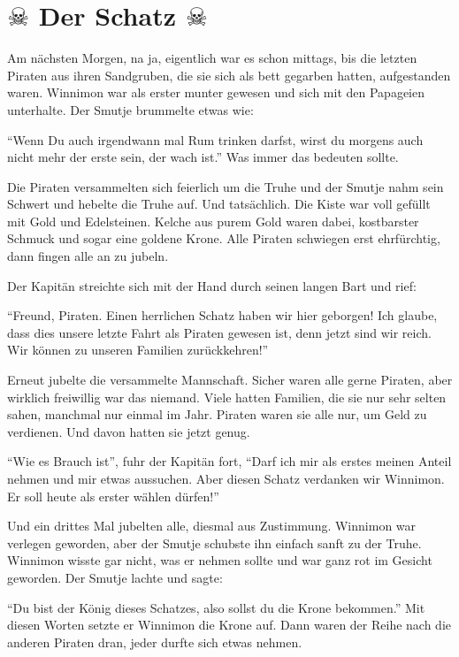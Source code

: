 \section*{\center $\skull$ Der Schatz $\skull$}
Am nächsten Morgen, na ja, eigentlich war es schon mittags, bis die letzten Piraten aus ihren Sandgruben, die sie sich als bett gegarben hatten, aufgestanden waren. Winnimon war als erster munter gewesen und sich mit den Papageien unterhalte. Der Smutje brummelte etwas wie: 

\enquote{Wenn Du auch irgendwann mal Rum trinken darfst, wirst du morgens auch nicht mehr der erste sein, der wach ist.} Was immer das bedeuten sollte.

Die Piraten versammelten sich feierlich um die Truhe und der Smutje nahm sein Schwert und hebelte die Truhe auf. Und tatsächlich. Die Kiste war voll gefüllt mit Gold und Edelsteinen. Kelche aus purem Gold waren dabei, kostbarster Schmuck und sogar eine goldene Krone. Alle Piraten schwiegen erst ehrfürchtig, dann fingen alle an zu jubeln.

Der Kapitän streichte sich mit der Hand durch seinen langen Bart und rief:

\enquote{Freund, Piraten. Einen herrlichen Schatz haben wir hier geborgen! Ich glaube, dass dies unsere letzte Fahrt als Piraten gewesen ist, denn jetzt sind wir reich. Wir können zu unseren Familien zurückkehren!}

Erneut jubelte die versammelte Mannschaft. Sicher waren alle gerne Piraten, aber wirklich freiwillig war das niemand. Viele hatten Familien, die sie nur sehr selten sahen, manchmal nur einmal im Jahr. Piraten waren sie alle nur, um Geld zu verdienen. Und davon hatten sie jetzt genug.

\enquote{Wie es Brauch ist}, fuhr der Kapitän fort, \enquote{Darf ich mir als erstes meinen Anteil nehmen und mir etwas aussuchen. Aber diesen Schatz verdanken wir Winnimon. Er soll heute als erster wählen dürfen!} 

Und ein drittes Mal jubelten alle, diesmal aus Zustimmung. Winnimon war verlegen geworden, aber der Smutje schubste ihn einfach sanft zu der Truhe. Winnimon wisste gar nicht, was er nehmen sollte und war ganz rot im Gesicht geworden. Der Smutje lachte und sagte:

\enquote{Du bist der König dieses Schatzes, also sollst du die Krone bekommen.} Mit diesen Worten setzte er Winnimon die Krone auf. Dann waren der Reihe nach die anderen Piraten dran, jeder durfte sich etwas nehmen.

